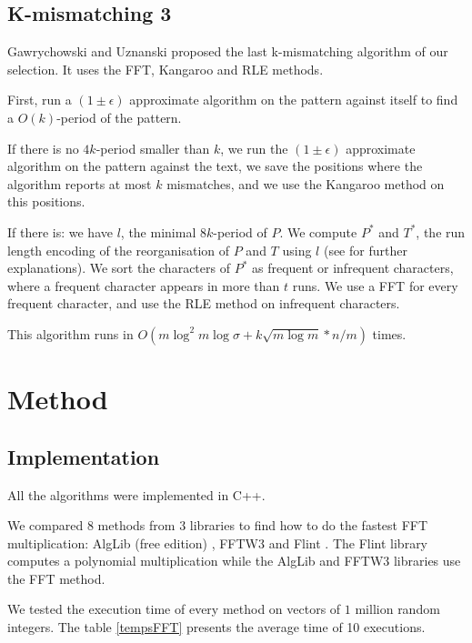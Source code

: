 \documentclass[preprint,12pt]{elsarticle}
\begin{document}
\subsection{K-mismatching 3}
Gawrychowski and Uznanski\cite{Kmism3} proposed the last k-mismatching algorithm of our selection.
It uses the FFT, Kangaroo and RLE methods. 

First, run a $(1 \pm \epsilon)$ approximate algorithm on the pattern against itself
to find a $O(k)$-period of the pattern.

If there is no $4k$-period smaller than $k$,
we run the $(1 \pm \epsilon)$ approximate algorithm on the pattern against the text,
we save the positions where the algorithm reports at most $k$ mismatches,
and we use the Kangaroo method on this positions. 

If there is: we have $l$, the minimal $8k$-period of $P$.
We compute $P^*$ and $T^*$, the run length encoding of the reorganisation of $P$ and $T$ using $l$
(see \cite{Kmism3} for further explanations).
We sort the characters of $P^*$ as frequent or infrequent characters,
where a frequent character appears in more than $t$ runs.
We use a FFT for every frequent character,
and use the RLE method on infrequent characters.

This algorithm runs in $O(m \log^2 m \log \sigma +k \sqrt{m \log m} * n/m)$ times.










\section{Method}
\label{Method}

\subsection*{Implementation}

All the algorithms were implemented in C++.

We compared $8$ methods from $3$ libraries to find how to do the fastest FFT multiplication:
AlgLib (free edition) \cite{alglib}, FFTW3 \cite{FFTW05} and Flint \cite{Hart2010}.
The Flint library computes a polynomial multiplication while
the AlgLib and FFTW3 libraries use the FFT method. %

We tested the execution time of every method on vectors of $1$ million random integers.
The table \ref{tempsFFT} presents the average time of 10 executions.
\end{document}
